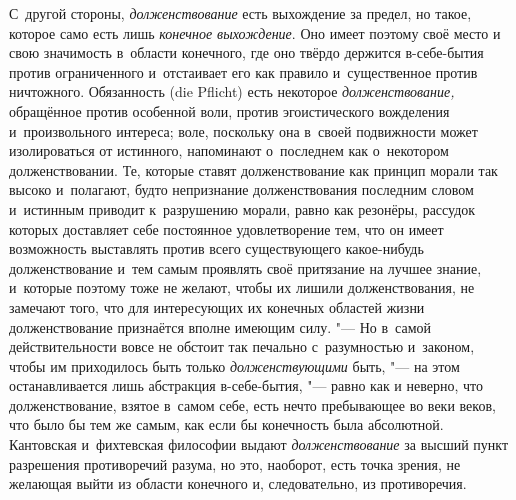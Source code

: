 С~другой стороны, {\em долженствование} есть выхождение
за предел, но такое, которое само есть лишь
{\em конечное выхождение}. Оно имеет поэтому своё место
и свою значимость в~области конечного, где оно твёрдо держится в-себе-бытия
против ограниченного и~отстаивает его как правило и~существенное против
ничтожного. Обязанность (die Pflicht) есть некоторое
{\em долженствование,} обращённое против особенной
воли, против эгоистического вожделения и~произвольного интереса; воле,
поскольку она в~своей подвижности может изолироваться от истинного,
напоминают о~последнем как о~некотором долженствовании. Те, которые ставят
долженствование как принцип морали так высоко и~полагают, будто непризнание
долженствования последним словом и~истинным приводит к~разрушению морали,
равно как резонёры, рассудок которых доставляет себе постоянное
удовлетворение тем, что он имеет возможность выставлять против всего
существующего какое-нибудь долженствование и~тем самым проявлять своё
притязание на лучшее знание, и~которые поэтому тоже не желают, чтобы их лишили
долженствования, не замечают того, что для интересующих их конечных
областей жизни долженствование признаётся вполне имеющим силу. "--- Но в~самой
действительности вовсе не обстоит так печально с~разумностью и~законом,
чтобы им приходилось быть только {\em долженствующими}
быть, "--- на этом останавливается лишь абстракция в-себе-бытия, "--- равно как и
неверно, что долженствование, взятое в~самом себе, есть нечто пребывающее
во веки веков, что было бы тем же самым, как если бы конечность была
абсолютной. Кантовская и~фихтевская философии выдают
{\em долженствование} за высший пункт разрешения
противоречий разума, но это, наоборот, есть точка зрения, не желающая выйти
из области конечного и, следовательно, из противоречия.

\label{ssssec:gamma}

